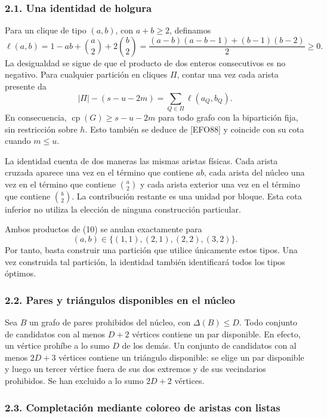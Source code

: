 \documentclass[spanish,11pt,a4paper]{article}
\begin{document}
\subsubsection{2.1. Una identidad de
holgura}\label{una-identidad-de-holgura}

Para un clique de tipo \((a,b)\), con \(a+b\ge2\), definamos \[
\ell(a,b)=1-ab+\binom a2+2\binom b2
=\frac{(a-b)(a-b-1)+(b-1)(b-2)}2\ge0. \tag{10}
\] La desigualdad se sigue de que el producto de dos enteros
consecutivos es no negativo. Para cualquier partición en cliques
\(\Pi\), contar una vez cada arista presente da \[
|\Pi|-(s-u-2m)=\sum_{Q\in\Pi}\ell(a_Q,b_Q). \tag{11}
\] En consecuencia, \(\operatorname{cp}(G)\ge s-u-2m\) para todo grafo
con la bipartición fija, sin restricción sobre \(h\). Esto también se
deduce de {[}EFO88{]} y coincide con su cota cuando \(m\le u\).

La identidad cuenta de dos maneras las mismas aristas físicas. Cada
arista cruzada aparece una vez en el término que contiene \(ab\), cada
arista del núcleo una vez en el término que contiene \(\binom a2\) y
cada arista exterior una vez en el término que contiene \(\binom b2\).
La contribución restante es una unidad por bloque. Esta cota inferior no
utiliza la elección de ninguna construcción particular.

Ambos productos de (10) se anulan exactamente para \[
(a,b)\in\{(1,1),(2,1),(2,2),(3,2)\}. \tag{12}
\] Por tanto, basta construir una partición que utilice únicamente estos
tipos. Una vez construida tal partición, la identidad también
identificará todos los tipos óptimos.

\subsubsection{2.2. Pares y triángulos disponibles en el
núcleo}\label{pares-y-triuxe1ngulos-disponibles-en-el-nuxfacleo}

Sea \(B\) un grafo de pares prohibidos del núcleo, con
\(\Delta(B)\le D\). Todo conjunto de candidatos con al menos \(D+2\)
vértices contiene un par disponible. En efecto, un vértice prohíbe a lo
sumo \(D\) de los demás. Un conjunto de candidatos con al menos \(2D+3\)
vértices contiene un triángulo disponible: se elige un par disponible y
luego un tercer vértice fuera de sus dos extremos y de sus vecindarios
prohibidos. Se han excluido a lo sumo \(2D+2\) vértices.

\subsubsection{2.3. Completación mediante coloreo de aristas con
listas}\label{completaciuxf3n-mediante-coloreo-de-aristas-con-listas}
\end{document}
